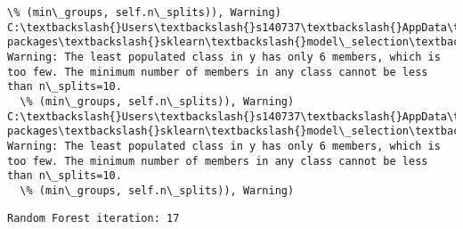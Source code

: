 \documentclass[11pt]{article}
\begin{document}
\begin{Verbatim}[commandchars=\\\{\}]
  \% (min\_groups, self.n\_splits)), Warning)
C:\textbackslash{}Users\textbackslash{}s140737\textbackslash{}AppData\textbackslash{}Local\textbackslash{}Continuum\textbackslash{}anaconda3\textbackslash{}lib\textbackslash{}site-packages\textbackslash{}sklearn\textbackslash{}model\_selection\textbackslash{}\_split.py:605: Warning: The least populated class in y has only 6 members, which is too few. The minimum number of members in any class cannot be less than n\_splits=10.
  \% (min\_groups, self.n\_splits)), Warning)
C:\textbackslash{}Users\textbackslash{}s140737\textbackslash{}AppData\textbackslash{}Local\textbackslash{}Continuum\textbackslash{}anaconda3\textbackslash{}lib\textbackslash{}site-packages\textbackslash{}sklearn\textbackslash{}model\_selection\textbackslash{}\_split.py:605: Warning: The least populated class in y has only 6 members, which is too few. The minimum number of members in any class cannot be less than n\_splits=10.
  \% (min\_groups, self.n\_splits)), Warning)

    \end{Verbatim}

    \begin{Verbatim}[commandchars=\\\{\}]
Random Forest iteration: 17 

    \end{Verbatim}
\end{document}
